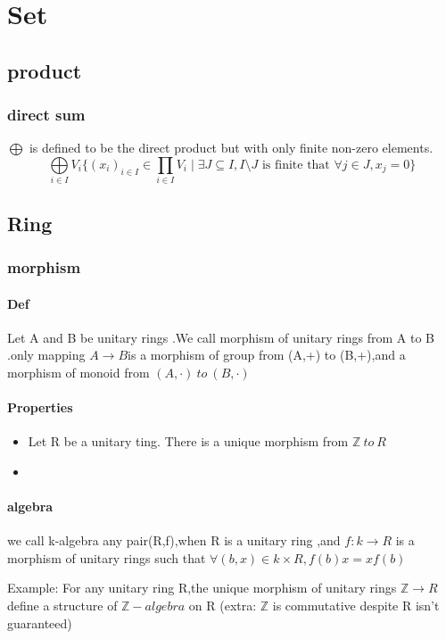\documentclass{book}
\begin{document}
\tableofcontents
\part{Set}
\chapter{product}
\section{direct sum}
$\bigoplus $ is defined to be the direct product but with only finite non-zero elements.$$\bigoplus\limits_{i\in I}V_i\{(x_i)_{i\in I}\in \prod\limits_{i\in I}V_i\mid \exists J\subseteq I,I\setminus J \text{ is finite that } \forall j\in J,x_j=0\}$$
\chapter{Ring}
\section{morphism}
    \subsection*{Def}
    \indent Let A and B be unitary rings .We call morphism of unitary rings from A to B .only mapping $A\rightarrow B$is a morphism of group from (A,+) to (B,+),and a morphism of monoid from $(A,\cdot)\ to\ (B,\cdot)$
    \subsection*{Properties}
    \begin{itemize}
        \item Let R be a unitary ting. There is a unique morphism from $\mathbb{Z}\ to\ R$
        \item 
    \end{itemize}
\subsection*{algebra}

we call k-algebra any pair(R,f),when R is a unitary ring ,and $f:k\rightarrow R$ is a morphism of unitary rings such that $\forall (b,x)\in k\times R,f(b)x=xf(b)$

Example:    For any unitary ring R,the unique morphism of unitary rings $\mathbb{Z}\rightarrow R$ define a structure of $\mathbb{Z}-algebra$ on R (extra: $\mathbb{Z}$ is commutative despite R isn't guaranteed)
\end{document}
